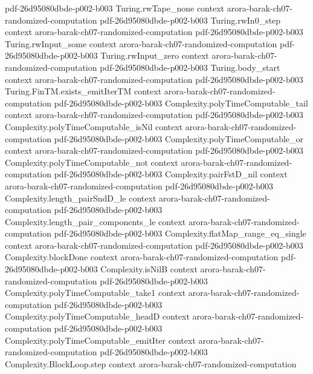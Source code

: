 \begin{theorem}
  {pdf-26d95080dbde-p002-b003}
\proofstep
  {Turing.rwTape_none}
  {context}
  {arora-barak-ch07-randomized-computation}
  {pdf-26d95080dbde-p002-b003}
\proofstep
  {Turing.rwIn0_step}
  {context}
  {arora-barak-ch07-randomized-computation}
  {pdf-26d95080dbde-p002-b003}
\proofstep
  {Turing.rwInput_some}
  {context}
  {arora-barak-ch07-randomized-computation}
  {pdf-26d95080dbde-p002-b003}
\proofstep
  {Turing.rwInput_zero}
  {context}
  {arora-barak-ch07-randomized-computation}
  {pdf-26d95080dbde-p002-b003}
\proofstep
  {Turing.body_start}
  {context}
  {arora-barak-ch07-randomized-computation}
  {pdf-26d95080dbde-p002-b003}
\proofstep
  {Turing.FinTM.exists_emitIterTM}
  {context}
  {arora-barak-ch07-randomized-computation}
  {pdf-26d95080dbde-p002-b003}
\proofstep
  {Complexity.polyTimeComputable_tail}
  {context}
  {arora-barak-ch07-randomized-computation}
  {pdf-26d95080dbde-p002-b003}
\proofstep
  {Complexity.polyTimeComputable_isNil}
  {context}
  {arora-barak-ch07-randomized-computation}
  {pdf-26d95080dbde-p002-b003}
\proofstep
  {Complexity.polyTimeComputable_or}
  {context}
  {arora-barak-ch07-randomized-computation}
  {pdf-26d95080dbde-p002-b003}
\proofstep
  {Complexity.polyTimeComputable_not}
  {context}
  {arora-barak-ch07-randomized-computation}
  {pdf-26d95080dbde-p002-b003}
\proofstep
  {Complexity.pairFstD_nil}
  {context}
  {arora-barak-ch07-randomized-computation}
  {pdf-26d95080dbde-p002-b003}
\proofstep
  {Complexity.length_pairSndD_le}
  {context}
  {arora-barak-ch07-randomized-computation}
  {pdf-26d95080dbde-p002-b003}
\proofstep
  {Complexity.length_pair_components_le}
  {context}
  {arora-barak-ch07-randomized-computation}
  {pdf-26d95080dbde-p002-b003}
\proofstep
  {Complexity.flatMap_range_eq_single}
  {context}
  {arora-barak-ch07-randomized-computation}
  {pdf-26d95080dbde-p002-b003}
\proofstep
  {Complexity.blockDone}
  {context}
  {arora-barak-ch07-randomized-computation}
  {pdf-26d95080dbde-p002-b003}
\proofstep
  {Complexity.isNilB}
  {context}
  {arora-barak-ch07-randomized-computation}
  {pdf-26d95080dbde-p002-b003}
\proofstep
  {Complexity.polyTimeComputable_take1}
  {context}
  {arora-barak-ch07-randomized-computation}
  {pdf-26d95080dbde-p002-b003}
\proofstep
  {Complexity.polyTimeComputable_headD}
  {context}
  {arora-barak-ch07-randomized-computation}
  {pdf-26d95080dbde-p002-b003}
\proofstep
  {Complexity.polyTimeComputable_emitIter}
  {context}
  {arora-barak-ch07-randomized-computation}
  {pdf-26d95080dbde-p002-b003}
\proofstep
  {Complexity.BlockLoop.step}
  {context}
  {arora-barak-ch07-randomized-computation}

\end{theorem}
